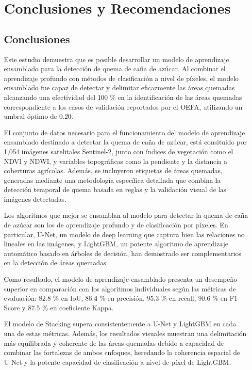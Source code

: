 \section{Conclusiones y Recomendaciones}
\subsection{Conclusiones}

Este estudio demuestra que es posible desarrollar un modelo de aprendizaje ensamblado para la detección 
de quema de caña de azúcar. Al combinar el aprendizaje profundo con métodos de clasificación a nivel de píxeles, 
el modelo ensamblado fue capaz de detectar y delimitar eficazmente las áreas quemadas alcanzando una efectividad 
del 100 \% en la identificación de las áreas quemadas correspondiente a los casos de validación reportados por el OEFA, 
utilizando un umbral óptimo de $0.20$.

El conjunto de datos necesario para el funcionamiento del modelo de aprendizaje ensamblado destinado a 
detectar la quema de caña de azúcar, está consituido por 1,054 imágenes satelitales Sentinel-2, junto con índices de vegetación 
como el NDVI y NDWI, y variables topográficas como la pendiente y la distancia a coberturas agrícolas. Además, se incluyeron 
etiquetas de áreas quemadas, generadas mediante una metodología específica detallada que combina la detección temporal de quema 
basada en reglas y la validación visual de las imágenes detectadas. 

Los algoritmos que mejor se ensamblan al modelo para detectar la quema de caña de azúcar son los de aprendizaje 
profundo y de clasificación por píxeles. En particular, U-Net, un modelo de deep learning que captura bien las relaciones no lineales 
en las imágenes, y LightGBM, un potente algoritmo de aprendizaje automático basado en árboles de decisión, han demostrado ser complementarios en la detección 
de áreas quemadas.

Como resultado, el modelo de aprendizaje ensamblado presenta un desempeño superior en comparación con los algoritmos individuales según las métricas de evaluación: 
82.8 \% en IoU, 86.4 \% en precisión, 95.3 \% en recall, 90.6 \% en F1-Score y 87.5 \% en coeficiente Kappa. 

El modelo de Stacking supera consistentemente a U-Net y LightGBM en cada una de estas 
métricas. Además, los resultados visuales muestran una delimitación más equilibrada y coherente de las áreas quemadas debido a capacidad de combinar las fortalezas de ambos enfoques, heredando la 
coherencia espacial de U-Net y la potente capacidad de clasificación a nivel de píxel de LightGBM.

